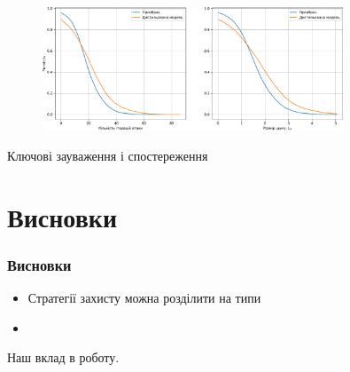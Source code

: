 \documentclass{beamer}
\numberwithin{equation}{section}
\begin{document}
	\begin{frame}

		\begin{figure}[h]
			\centering
			\includegraphics[width=0.8\textwidth]{../images/distAllT7.pdf}
			
		\end{figure}
	
	    Ключові зауваження і спостереження
	\end{frame}

	
	
	
	\section{Висновки}
	\begin{frame}
		\frametitle{Висновки}
		
		\begin{itemize}
			\item Стратегії захисту можна розділити на типи
			
			
			\item
		\end{itemize}
		Наш вклад в роботу.
	\end{frame}
		
\end{document}
